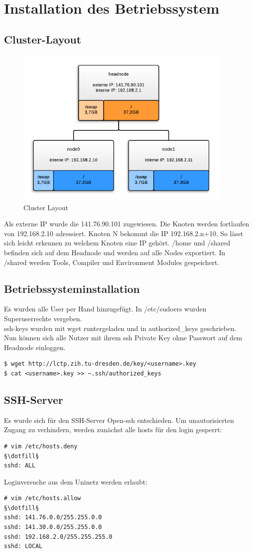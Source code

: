 \chapter{Installation des Betriebssystem}
\section{Cluster-Layout}
\begin{figure}[H]
	\centering
	\includegraphics[width=400px]{cluster_layout.png}
	\caption{Cluster Layout}
\end{figure}
Als externe IP wurde die 141.76.90.101 zugewiesen. Die Knoten werden fortlaufen von 192.168.2.10 adressiert. Knoten N bekommt die IP 192.168.2.n+10.
So lässt sich leicht erkennen zu welchem Knoten eine IP gehört.
/home und /shared befinden sich auf dem Headnode und werden auf alle Nodes exportiert. In /shared werden Tools, Compiler und Environment Modules gespeichert.\\
\section{Betriebssysteminstallation}
Es wurden alle User per Hand hinzugefügt. In /etc/sudoers wurden Superuserrechte vergeben.\\
ssh-keys wurden mit wget runtergeladen und in authorized\_keys geschrieben. Nun können sich alle Nutzer mit ihrem ssh Private Key ohne Passwort auf dem Headnode einloggen.
\begin{lstlisting}[style=Bash]
$ wget http://lctp.zih.tu-dresden.de/key/<username>.key
$ cat <username>.key >> ~.ssh/authorized_keys
\end{lstlisting}
\section{SSH-Server}
Es wurde sich für den SSH-Server Open-ssh entschieden. Um unautorisierten Zugang zu verhindern, werden zunächst alle hosts für den login gesperrt:
\begin{lstlisting}[style=Bash]
# vim /etc/hosts.deny
§\dotfill§
sshd: ALL
\end{lstlisting}
Loginversuche aus dem Uninetz werden erlaubt:
\begin{lstlisting}[style=Bash]
# vim /etc/hosts.allow
§\dotfill§
sshd: 141.76.0.0/255.255.0.0
sshd: 141.30.0.0/255.255.0.0
sshd: 192.168.2.0/255.255.255.0
sshd: LOCAL 
\end{lstlisting}

